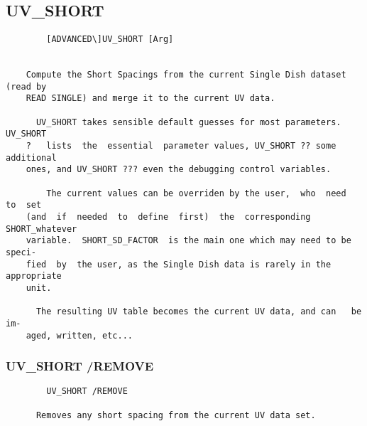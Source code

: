 \subsection{UV\_SHORT}
\begin{verbatim}
        [ADVANCED\]UV_SHORT [Arg]


    Compute the Short Spacings from the current Single Dish dataset (read by
    READ SINGLE) and merge it to the current UV data.

      UV_SHORT takes sensible default guesses for most parameters.  UV_SHORT
    ?   lists  the  essential  parameter values, UV_SHORT ?? some additional
    ones, and UV_SHORT ??? even the debugging control variables.

        The current values can be overriden by the user,  who  need  to  set
    (and  if  needed  to  define  first)  the  corresponding  SHORT_whatever
    variable.  SHORT_SD_FACTOR  is the main one which may need to be  speci-
    fied  by  the user, as the Single Dish data is rarely in the appropriate
    unit.

      The resulting UV table becomes the current UV data, and can   be   im-
    aged, written, etc...

\end{verbatim}
\subsubsection{UV\_SHORT /REMOVE}
\begin{verbatim}
        UV_SHORT /REMOVE

      Removes any short spacing from the current UV data set.

\end{verbatim}
